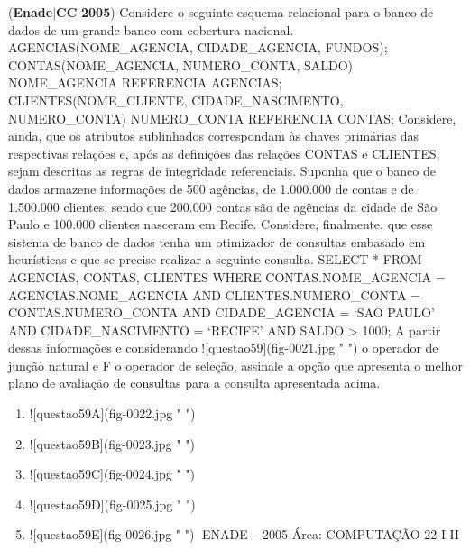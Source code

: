 \documentclass{exam}
\begin{document}
\begin{questions}
\begin{enumerate}[label=\alph*)]
	\end{enumerate}

\question (\textbf{Enade}$|$\textbf{CC}-\textbf{2005}) Considere o seguinte esquema relacional para o banco de dados de um grande banco com cobertura nacional.
AGENCIAS(NOME\_AGENCIA, CIDADE\_AGENCIA, FUNDOS);
CONTAS(NOME\_AGENCIA, NUMERO\_CONTA, SALDO) NOME\_AGENCIA REFERENCIA AGENCIAS;
CLIENTES(NOME\_CLIENTE, CIDADE\_NASCIMENTO, NUMERO\_CONTA) NUMERO\_CONTA REFERENCIA CONTAS;
Considere, ainda, que os atributos sublinhados correspondam às chaves primárias das respectivas relações e, após as definições das
relações CONTAS e CLIENTES, sejam descritas as regras de integridade referenciais. Suponha que o banco de dados armazene
informações de 500 agências, de 1.000.000 de contas e de 1.500.000 clientes, sendo que 200.000 contas são de agências da cidade
de São Paulo e 100.000 clientes nasceram em Recife. Considere, finalmente, que esse sistema de banco de dados tenha um otimizador
de consultas embasado em heurísticas e que se precise realizar a seguinte consulta.
SELECT *
FROM AGENCIAS, CONTAS, CLIENTES
WHERE CONTAS.NOME\_AGENCIA = AGENCIAS.NOME\_AGENCIA
AND CLIENTES.NUMERO\_CONTA = CONTAS.NUMERO\_CONTA
AND CIDADE\_AGENCIA = ‘SAO PAULO’
AND CIDADE\_NASCIMENTO = ‘RECIFE’
AND SALDO > 1000;
A partir dessas informações e considerando ![questao59](fig-0021.jpg " ") o operador de junção natural e F o operador de seleção, assinale a opção que apresenta
o melhor plano de avaliação de consultas para a consulta apresentada acima.
	\begin{enumerate}[label=\alph*)]
		\item  ![questao59A](fig-0022.jpg " ")
		\item 	![questao59B](fig-0023.jpg " ")
		\item 	![questao59C](fig-0024.jpg " ")
		\item 	![questao59D](fig-0025.jpg " ")
		\item 	![questao59E](fig-0026.jpg " ")
ENADE – 2005 Área: COMPUTAÇÃO 22
I
II

	\end{enumerate}


\end{questions}
\end{document}
